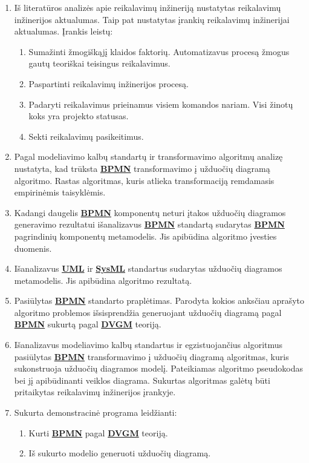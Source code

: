 \documentclass{VUMIFInfBakalaurinis}
\newcommand{\bhyperref}[2]{\hyperref[#1]{\textbf{#2}}}
\newcommand{\DVCM}{\bhyperref{section:dvcm}{DVGM}}
\newcommand{\BPMN}{\bhyperref{section:bpmn}{BPMN}}
\newcommand{\UML}{\bhyperref{def:uml}{UML}}
\newcommand{\SysML}{\bhyperref{def:sysml}{SysML}}
\begin{document}
\begin{enumerate}
  \item Iš literatūros analizės apie reikalavimų inžineriją nustatytas reikalavimų inžinerijos aktualumas. Taip pat nustatytas įrankių reikalavimų inžinerijai aktualumas. Įrankis leistų:
  \begin{enumerate}
    \item Sumažinti žmogiškąjį klaidos faktorių. Automatizavus procesą žmogus gautų teoriškai teisingus reikalavimus.
    \item Paspartinti reikalavimų inžinerijos procesą.
    \item Padaryti reikalavimus prieinamus visiem komandos nariam. Visi žinotų koks yra projekto statusas.
    \item Sekti reikalavimų pasikeitimus.
  \end{enumerate}
  \item Pagal modeliavimo kalbų standartų ir transformavimo algoritmų analizę nustatyta, kad trūksta \BPMN{} transformavimo į užduočių diagramą algoritmo. Rastas algoritmas, kuris atlieka transformaciją remdamasis empirinėmis taisyklėmis.
  \item Kadangi daugelis \BPMN{} komponentų neturi įtakos užduočių diagramos generavimo rezultatui išanalizavus \BPMN{} standartą sudarytas \BPMN{} pagrindinių komponentų metamodelis. Jis apibūdina algoritmo įvesties duomenis.
  \item Išanalizavus \UML{} ir \SysML{} standartus sudarytas užduočių diagramos metamodelis. Jis apibūdina algoritmo rezultatą.
  \item Pasiūlytas \BPMN{} standarto praplėtimas. Parodyta kokios anksčiau aprašyto algoritmo problemos išsisprendžia generuojant užduočių diagramą pagal \BPMN{} sukurtą pagal \DVCM{} teoriją.
  \item Išanalizavus modeliavimo kalbų standartus ir egzistuojančius algoritmus pasiūlytas \BPMN{} transformavimo į užduočių diagramą algoritmas, kuris sukonstruoja užduočių diagramos modelį. Pateikiamas algoritmo pseudokodas bei jį apibūdinanti veiklos diagrama. Sukurtas algoritmas galėtų būti pritaikytas reikalavimų inžinerijos įrankyje.
  \item Sukurta demonstracinė programa leidžianti:
  \begin{enumerate}
    \item Kurti \BPMN{} pagal \DVCM{} teoriją.
    \item Iš sukurto modelio generuoti užduočių diagramą.
  \end{enumerate}
\end{enumerate}
\end{document}

